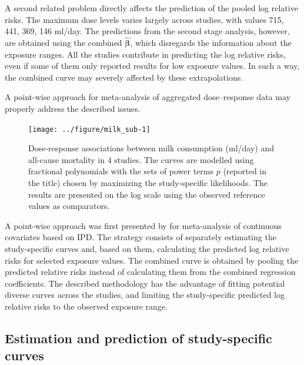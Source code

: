 \documentclass[11pt,a4paper,twoside,openany]{book}\usepackage{knitr}
\begin{document}
{\noindent A second related problem directly affects the prediction of the pooled log relative risks. The maximum dose levels varies largely across studies, with values 715, 441, 369, 146 ml/day. 
The predictions from the second stage analysis, however, are obtained using the combined $\boldsymbol{\hat \beta}$, which disregards the information about the exposure ranges. All the studies contribute in predicting the log relative risks, even if some of them only reported results for low exposure values. In such a way, the combined curve may severely affected by these extrapolations.

A point-wise approach for meta-analysis of aggregated dose--response data may properly address the described issues.

\begin{knitrout}\footnotesize
{}\color{fgcolor}\begin{figure}[ht!]

{\centering \texttt{[image: ../figure/milk\_sub-1]} 

}

\caption[Dose-response associations between milk consumption (ml/day) and all-cause mortality in 4 studies]{Dose-response associations between milk consumption (ml/day) and all-cause mortality in 4 studies. The curves are modelled using fractional polynomials with the sets of power terms $p$ (reported in the title) chosen by maximizing the study-specific likelihoods. The results are presented on the log scale using the observed reference values as comparators.}\label{fig:milk_sub}
\end{figure}


\end{knitrout}

A point-wise approach was first presented by \cite{sauerbrei2011new} for meta-analysis of continuous covariates based on IPD. The strategy consists of separately estimating the study-specific curves and, based on them, calculating the predicted log relative risks for selected exposure values. The combined curve is obtained by pooling the predicted relative risks instead of calculating them from the combined regression coefficients. The described methodology has the advantage of fitting potential diverse curves across the studies, and limiting the study-specific predicted log relative risks to the observed exposure range.   

\subsection{Estimation and prediction of study-specific curves}

}
\end{document}
